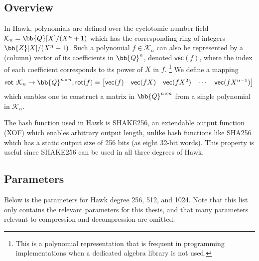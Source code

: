 \subsection{Overview}
In Hawk, polynomials are defined over the cyclotomic number field $\mathcal{K}_n = \bb{Q}[X]/(X^n +1)$ which has the corresponding ring of integers
$\bb{Z}[X] / (X^n + 1)$. Such a polynomial $f \in \mathcal{K}_n$ can also be represented by a (column) vector of its coefficients in $\bb{Q}^n$, denoted $\mathsf{vec}(f)$, where the index of 
each coefficient corresponds to its power of $X$ in $f$. 
\footnote{This is a polynomial representation that is frequent in programming implementations when a dedicated algebra library is not used.}
We define a mapping 
\[\mathsf{rot:} \mathcal{K}_n \rightarrow \bb{Q}^{n \times n}, \mathsf{rot}(f) = 
\begin{bmatrix} 
    \mathsf{vec}(f) & \mathsf{vec}(fX) & \mathsf{vec}(fX^2) & \cdots & \mathsf{vec}(fX^{n-1})
\end{bmatrix}    
\]
which enables one to construct a matrix in $\bb{Q}^{n \times n}$ from a single polynomial in $\mathcal{K}_n$.

The hash function used in Hawk is SHAKE256, an extendable output function (XOF) which enables arbitrary output length, unlike hash functions like SHA256 which 
has a static output size of 256 bits (as eight 32-bit words). This property is useful since SHAKE256 can be used in all three degrees of Hawk.

\subsection{Parameters}
Below is the parameters for Hawk degree 256, 512, and 1024. Note that this list only contains the relevant parameters for this thesis, and that many parameters relevant to 
compression and decompression are omitted.

